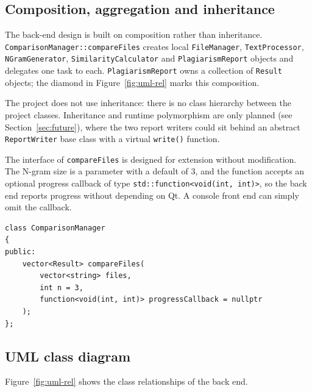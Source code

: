 \documentclass[11pt,a4paper]{report}
\newcommand{\cc}[1]{\texttt{#1}}
\begin{document}
\subsection{Composition, aggregation and inheritance}
The back-end design is built on composition rather than inheritance.
\cc{ComparisonManager::compareFiles} creates local \cc{FileManager}, \cc{TextProcessor},
\cc{NGramGenerator}, \cc{SimilarityCalculator} and \cc{PlagiarismReport} objects and
delegates one task to each. \cc{PlagiarismReport} owns a collection of \cc{Result} objects;
the diamond in Figure~\ref{fig:uml-rel} marks this composition.

The project does not use inheritance: there is no class hierarchy between the project
classes. Inheritance and runtime polymorphism are only planned (see
Section~\ref{sec:future}), where the two report writers could sit behind an abstract
\cc{ReportWriter} base class with a virtual \cc{write()} function.

The interface of \cc{compareFiles} is designed for extension without modification. The
N-gram size is a parameter with a default of 3, and the function accepts an optional
progress callback of type \cc{std::function<void(int, int)>}, so the back end reports
progress without depending on Qt. A console front end can simply omit the callback.

\begin{lstlisting}[caption={Comparison Manager signature: defaults and an optional progress callback.}]
class ComparisonManager
{
public:
    vector<Result> compareFiles(
        vector<string> files,
        int n = 3,
        function<void(int, int)> progressCallback = nullptr
    );
};
\end{lstlisting}

\subsection{UML class diagram}
Figure~\ref{fig:uml-rel} shows the class relationships of the back end.
\end{document}
